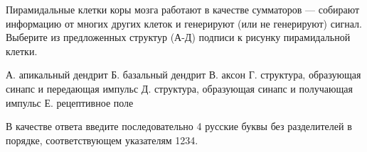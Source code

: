 
Пирамидальные клетки коры мозга работают в качестве сумматоров — собирают информацию от многих других клеток и генерируют (или не генерируют) сигнал. Выберите из предложенных структур (А-Д) подписи к рисунку пирамидальной клетки.


А. апикальный дендрит
Б. базальный дендрит
В. аксон
Г. структура, образующая синапс и передающая импульс
Д. структура, образующая синапс и получающая импульс
Е. рецептивное поле

В качестве ответа введите последовательно 4 русские буквы без разделителей в порядке, соответствующем указателям 1234.


